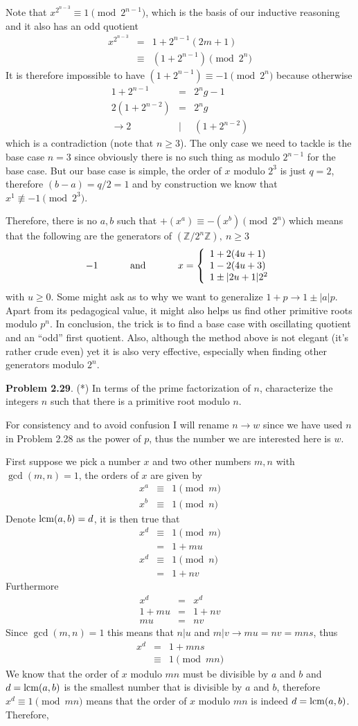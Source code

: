 \documentclass[aps,preprint,preprintnumbers,nofootinbib,showpacs,prd]{revtex4-1}
\newcommand{\ba}{\begin{array}}
\newcommand{\ea}{\end{array}}
\newcommand{\nbea}{\begin{eqnarray*}}
\newcommand{\neea}{\end{eqnarray*}}
\begin{document}
Note that $x^{2^{n-3}} \equiv 1 \pmod{2^{n-1}}$, which is the basis of our inductive reasoning and it also has an odd quotient
%
\nbea
x^{2^{n-3}} & = & 1 + 2^{n-1}(2m+1) \\
& \equiv & (1 + 2^{n-1}) \pmod{2^n}
\neea
%
It is therefore impossible to have $(1 + 2^{n-1}) \equiv -1 \pmod{2^n}$ because otherwise
%
\nbea
1 + 2^{n-1} & = & 2^n g - 1 \\
2(1 + 2^{n-2}) & = & 2^n g \\
\to 2 & | & (1 + 2^{n-2})
\neea
%
which is a contradiction (note that $n \ge 3$). The only case we need to tackle is the base case $n=3$ since obviously there is no such thing as modulo $2^{n-1}$ for the base case. But our base case is simple, the order of $x$ modulo $2^3$ is just $q = 2$, therefore $(b-a) = q/2 = 1$ and by construction we know that $x^1 \not\equiv -1 \pmod{2^3}$.

Therefore, there is no $a,b$ such that $+(x^a) \equiv -(x^b) \pmod{2^n}$ which means that the following are the generators of $(\mathbb{Z}/2^n\mathbb{Z}),~n \ge 3$
%
\nbea
-1 ~~~~~~~~~~{\rm and}~~~~~~~~~~
x =  \left \{ \ba{l}
1 + 2(4u+1)  \\
1 - 2(4u+3) \\
1 \pm |2u+1|2^2
\ea
\right.
\neea
%
with $u \ge 0$. Some might ask as to why we want to generalize $1 + p \to 1 \pm |a|p$. Apart from its pedagogical value, it might also helps us find other primitive roots modulo $p^n$. In conclusion, the trick is to find a base case with oscillating quotient and an ``odd'' first quotient. Also, although the method above is not elegant (it's rather crude even) yet it is also very effective, especially when finding other generators modulo $2^n$.

{\bf Problem 2.29}. (*) In terms of the prime factorization of $n$, characterize the integers $n$ such that there is a primitive root modulo $n$.

For consistency and to avoid confusion I will rename $n \to w$ since we have used $n$ in Problem 2.28 as the power of $p$, thus the number we are interested here is $w$.

First suppose we pick a number $x$ and two other numbers $m,n$ with $\gcd(m,n) = 1$, the orders of $x$ are given by
%
\nbea
x^a & \equiv & 1 \pmod{m} \\
x^b & \equiv & 1 \pmod{n}
\neea
%
Denote ${\rm lcm}(a,b) = d$, it is then true that
%
\nbea
x^d &\equiv & 1 \pmod{m} \\
& = & 1 + mu\\
x^d & \equiv & 1 \pmod{n} \\
& = & 1 + nv
\neea
%
Furthermore
%
\nbea
x^d & = & x^d \\
1 + mu & = & 1 +nv \\
mu & = & nv
\neea
%
Since $\gcd(m,n)=1$ this means that $n|u$ and $m|v \to mu=nv = mns$, thus
%
\nbea
x^d & = & 1 + mn s \\
& \equiv & 1 \pmod{mn}
\neea
%
We know that the order of $x$ modulo $mn$ must be divisible by $a$ and $b$ and $d = {\rm lcm}(a,b)$ is the smallest number that is divisible by $a$ and $b$, therefore $x^d \equiv 1 \pmod{mn}$ means that the order of $x$ modulo $mn$ is indeed $d = {\rm lcm}(a,b)$. Therefore,
\end{document}
